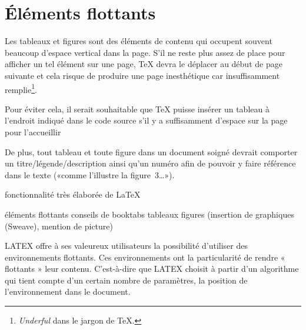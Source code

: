 \section{Éléments flottants}
\label{sec:tableaux:floats}

Les tableaux et figures sont des éléments de contenu qui occupent
souvent beaucoup d'espace vertical dans la page. S'il ne reste plus
assez de place pour afficher un tel élément sur une page, {\TeX} devra
le déplacer au début de page suivante et cela risque de produire une
page inesthétique car insuffisamment remplie\footnote{%
  \emph{Underful } dans le jargon de {\TeX}.}. %

Pour éviter cela, il serait souhaitable que {\TeX} puisse insérer un
tableau à l'endroit indiqué dans le code source s'il y a suffisamment
d'espace sur la page pour l'accueillir


De plus, tout tableau et toute figure dans un document soigné devrait
comporter un titre/légende/description ainsi qu'un numéro afin de
pouvoir y faire référence dans le texte («comme l'illustre la
figure~3\dots»).

fonctionnalité très élaborée de LaTeX


éléments flottants
conseils de booktabs
tableaux
figures (insertion de graphiques (Sweave), mention de picture)

LATEX offre à ses valeureux utilisateurs la possibilité d'utiliser des environnements flottants. Ces environnements ont la particularité de rendre « flottants » leur contenu. C'est-à-dire que LATEX choisit à partir d'un algorithme qui tient compte d'un certain nombre de paramètres, la position de l'environnement dans le document.

